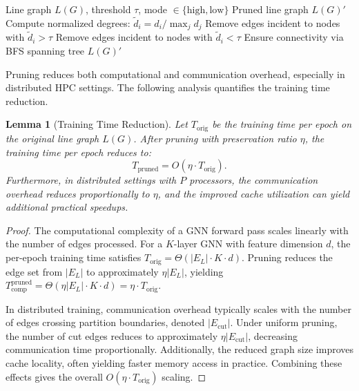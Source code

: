 \documentclass[pdflatex,sn-mathphys-num]{sn-jnl}%
\theoremstyle{thmstyleone}%
\theoremstyle{thmstyletwo}%
\theoremstyle{thmstylethree}%
\theoremstyle{plain} %
\newtheorem{lemma}{Lemma}
\theoremstyle{definition} %
\theoremstyle{remark} %
\theoremstyle{plain} %
\begin{document}
\begin{algorithm}[H]
\caption{Degree-Based Hierarchical Pruning}
\label{algo:degree_pruning}
\begin{algorithmic}[1]
\Require Line graph $L(G)$, threshold $\tau$, mode $\in \{\text{high}, \text{low}\}$
\Ensure Pruned line graph $L(G)'$
\State Compute normalized degrees: $\tilde{d}_i = d_i / \max_j d_j$
    \State Remove edges incident to nodes with $\tilde{d}_i > \tau$
    \State Remove edges incident to nodes with $\tilde{d}_i < \tau$
\EndIf
\State Ensure connectivity via BFS spanning tree
\State \Return $L(G)'$
\end{algorithmic}
\end{algorithm}


Pruning reduces both computational and communication overhead, especially in distributed HPC settings. The following analysis quantifies the training time reduction.
\begin{lemma}[Training Time Reduction]
\label{lemma:trainingTimeReduction}
Let $T_{\text{orig}}$ be the training time per epoch on the original line graph $L(G)$. After pruning with preservation ratio $\eta$, the training time per epoch reduces to:
\[
T_{\text{pruned}} = O(\eta \cdot T_{\text{orig}}).
\]
Furthermore, in distributed settings with $P$ processors, the communication overhead reduces proportionally to $\eta$, and the improved cache utilization can yield additional practical speedups.
\end{lemma}

\begin{proof}
The computational complexity of a GNN forward pass scales linearly with the number of edges processed. For a $K$-layer GNN with feature dimension $d$, the per-epoch training time satisfies $T_{\text{orig}} = \Theta(|E_L| \cdot K \cdot d)$. Pruning reduces the edge set from $|E_L|$ to approximately $\eta|E_L|$, yielding $T_{\text{comp}}^{\text{pruned}} = \Theta(\eta|E_L| \cdot K \cdot d) = \eta \cdot T_{\text{orig}}$.

In distributed training, communication overhead typically scales with the number of edges crossing partition boundaries, denoted $|E_{\text{cut}}|$. Under uniform pruning, the number of cut edges reduces to approximately $\eta|E_{\text{cut}}|$, decreasing communication time proportionally. Additionally, the reduced graph size improves cache locality, often yielding faster memory access in practice. Combining these effects gives the overall $O(\eta \cdot T_{\text{orig}})$ scaling.
\end{proof}
\end{document}
